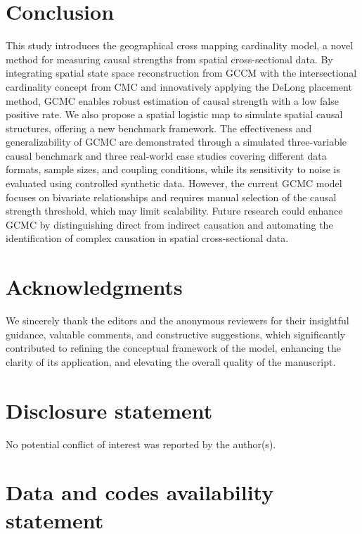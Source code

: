 \documentclass[authoryear,preprint,review,12pt]{elsarticle}
\begin{document}
\section{Conclusion}\label{sec5} 

This study introduces the geographical cross mapping cardinality model, a novel method for measuring causal strengths from spatial cross-sectional data. By integrating spatial state space reconstruction from GCCM with the intersectional cardinality concept from CMC and innovatively applying the DeLong placement method, GCMC enables robust estimation of causal strength with a low false positive rate. We also propose a spatial logistic map to simulate spatial causal structures, offering a new benchmark framework. The effectiveness and generalizability of GCMC are demonstrated through a simulated three-variable causal benchmark and three real-world case studies covering different data formats, sample sizes, and coupling conditions, while its sensitivity to noise is evaluated using controlled synthetic data. However, the current GCMC model focuses on bivariate relationships and requires manual selection of the causal strength threshold, which may limit scalability. Future research could enhance GCMC by distinguishing direct from indirect causation and automating the identification of complex causation in spatial cross-sectional data.

\section*{Acknowledgments}

We sincerely thank the editors and the anonymous reviewers for their insightful guidance, valuable comments, and constructive suggestions, which significantly contributed to refining the conceptual framework of the model, enhancing the clarity of its application, and elevating the overall quality of the manuscript.

\section*{Disclosure statement}

No potential conflict of interest was reported by the author(s).

\section*{Data and codes availability statement}
\end{document}
